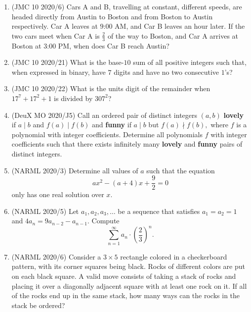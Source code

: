 \documentclass{article}
\begin{document}
\begin{enumerate}
\item (JMC 10 2020/6) Cars A and B, travelling at constant, different speeds, are headed directly from Austin to Boston and from Boston to Austin respectively. Car A leaves at $9\text{:}00$ AM, and Car B leaves an hour later. If the two cars meet when Car A is $\frac{2}{3}$ of the way to Boston, and Car A arrives at Boston at $3\text{:}00$ PM, when does Car B reach Austin?

\item (JMC 10 2020/21) What is the base-$10$ sum of all positive integers such that, when expressed in binary, have $7$ digits and have no two consecutive $1$'s?

\item (JMC 10 2020/22) What is the units digit of the remainder when $17^7+17^2+1$ is divided by $307^2$?

\item (DeuX MO 2020/J5) Call an ordered pair of distinct integers $(a,b)$ \textbf{lovely} if $a\mid b$ and $f(a)\mid f(b)$ and \textbf{funny} if $a\mid b$ but $f(a)\nmid f(b),$ where $f$ is a polynomial with integer coefficients. Determine all polynomials $f$ with integer coefficients such that there exists infinitely many \textbf{lovely} and \textbf{funny} pairs of distinct integers.

\item (NARML 2020/3) Determine all values of $a$ such that the equation\[ax^2-(a+4)x+\frac{9}{2}=0\]only has one real solution over $x.$

\item (NARML 2020/5) Let $a_1,a_2,a_3,\ldots$ be a sequence that satisfies $a_1=a_2=1$ and $4a_n=9a_{n-2}-a_{n-1}.$ Compute
\[\sum_{n=1}^{\infty}a_n\cdot \left(\frac{2}{3}\right)^n.\]

\item (NARML 2020/6) Consider a $3\times 5$ rectangle colored in a checkerboard pattern, with its corner squares being black. Rocks of different colors are put on each black square. A valid move consists of taking a stack of rocks and placing it over a diagonally adjacent square with at least one rock on it. If all of the rocks end up in the same stack, how many ways can the rocks in the stack be ordered?


\end{enumerate}
\end{document}
